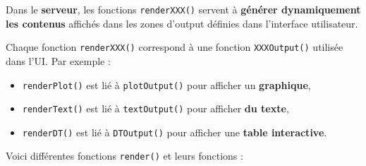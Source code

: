 \documentclass[
]{article}
\providecommand{\tightlist}{%
  \setlength{\itemsep}{0pt}\setlength{\parskip}{0pt}}
\begin{document}
Dans le \textbf{serveur}, les fonctions \texttt{renderXXX()} servent à
\textbf{générer dynamiquement les contenus} affichés dans les zones
d'output définies dans l'interface utilisateur.

Chaque fonction \texttt{renderXXX()} correspond à une fonction
\texttt{XXXOutput()} utilisée dans l'UI. Par exemple :

\begin{itemize}
\tightlist
\item
  \texttt{renderPlot()} est lié à \texttt{plotOutput()} pour afficher un
  \textbf{graphique},\\
\item
  \texttt{renderText()} est lié à \texttt{textOutput()} pour afficher
  \textbf{du texte},\\
\item
  \texttt{renderDT()} est lié à \texttt{DTOutput()} pour afficher une
  \textbf{table interactive}.
\end{itemize}

Voici différentes fonctions \texttt{render()} et leurs fonctions :
\end{document}
